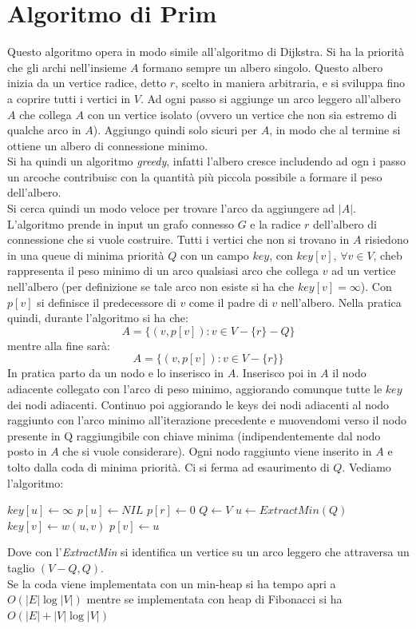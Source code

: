 \documentclass[a4paper,12pt, oneside]{book}
\begin{document}
\section{Algoritmo di Prim}
Questo algoritmo opera in modo simile all'algoritmo di Dijkstra. Si ha
la priorità che gli archi nell'insieme $A$ formano sempre un albero
singolo. Questo albero inizia da un vertice radice, detto $r$, scelto
in maniera arbitraria, e si sviluppa fino a coprire tutti i vertici in
$V$. Ad ogni passo si aggiunge un arco leggero all'albero $A$ che
collega $A$ con un vertice isolato (ovvero un vertice che non sia
estremo di qualche arco in $A$). Aggiungo quindi solo sicuri per $A$,
in modo che al termine si ottiene un albero di connessione minimo. \\
Si ha quindi un algoritmo \textit{greedy}, infatti l'albero cresce
includendo ad ogn i passo un arcoche contribuisc con la quantità più
piccola possibile a formare il peso dell'albero.\\
Si cerca quindi un modo veloce per trovare l'arco da aggiungere ad
$|A|$. L'algoritmo prende in input un grafo connesso $G$ e la radice
$r$ dell'albero di connessione che si vuole costruire. Tutti i vertici
che non si trovano in $A$ risiedono in una queue di minima priorità
$Q$ con un campo $key$, con $key[v]$, $\forall v\in V$, cheb
rappresenta il peso minimo di un arco qualsiasi arco che collega $v$
ad un vertice nell'albero (per definizione se tale arco non esiste si
ha che $key[v]=\infty$). Con $p[v]$ si definisce il predecessore di
$v$ come il padre di $v$ nell'albero. Nella pratica quindi, durante
l'algoritmo si ha che:
\[A=\{(v,p[v]):v\in V-\{r\}-Q\}\]
mentre alla fine sarà:
\[A=\{(v,p[v]):v\in V-\{r\}\}\]
In pratica parto da un nodo e lo inserisco in $A$. Inserisco poi in
$A$ il nodo adiacente collegato con l'arco di peso minimo, aggiorando
comunque tutte le $key$ dei nodi adiacenti. Continuo poi aggiorando le
keys dei nodi adiacenti al nodo raggiunto con l'arco minimo
all'iterazione precedente e muovendomi verso il nodo presente in Q
raggiungibile con chiave minima (indipendentemente dal nodo posto in
$A$ che si vuole considerare). Ogni nodo raggiunto viene inserito in
$A$ e tolto dalla coda di minima priorità. Ci si ferma ad esaurimento
di $Q$.
Vediamo l'algoritmo:
\begin{algorithm}[H]
  \begin{algorithmic}
    \State $key[u]\gets \infty$
    \State $p[u]\gets NIL$
    \EndFor
    \State $p[r]\gets 0$
    \State $Q\gets V$
    \State $u\gets ExtractMin(Q)$
    \State $key[v]\gets w(u,v)$
    \State $p[v]\gets u$
    \EndIf
    \EndFor
    \EndWhile
    \EndFunction
  \end{algorithmic}
\end{algorithm}
Dove con l'\textit{ExtractMin} si identifica un vertice su un arco
leggero che attraversa un taglio $(V-Q,Q)$.\\
Se la coda viene implementata con un min-heap si ha tempo apri a
$O(|E|\log |V|)$ mentre se implementata con heap di Fibonacci si ha
$O(|E|+|V|\log |V|)$
\end{document}
